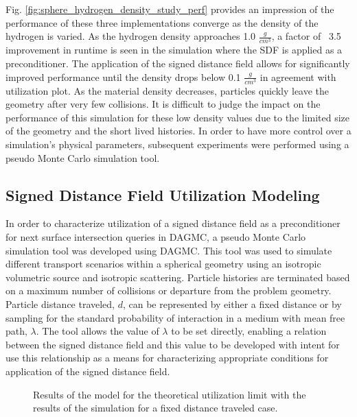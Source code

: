 Fig. \ref{fig:sphere_hydrogen_density_study_perf} provides an impression of the
performance of these three implementations converge as the density of the
hydrogen is varied. As the hydrogen density approaches 1.0 $\frac{g}{cm^3}$, a
factor of ~3.5 improvement in runtime is seen in the simulation where the SDF is
applied as a preconditioner. The application of the signed distance field allows
for significantly improved performance until the density drops below 0.1
$\frac{g}{cm^3}$ in agreement with utilization plot. As the material density
decreases, particles quickly leave the geometry after very few collisions. It is
difficult to judge the impact on the performance of this simulation for these
low density values due to the limited size of the geometry and the short lived
histories.  In order to have more control over a simulation's physical
parameters, subsequent experiments were performed using a pseudo Monte Carlo
simulation tool.

\subsection{Signed Distance Field Utilization Modeling}

In order to characterize utilization of a signed distance field as a
preconditioner for next surface intersection queries in DAGMC, a pseudo Monte
Carlo simulation tool was developed using DAGMC. This tool was used to simulate
different transport scenarios within a spherical geometry using an isotropic
volumetric source and isotropic scattering. Particle histories are terminated
based on a maximum number of collisions or departure from the problem
geometry. Particle distance traveled, $d$, can be represented by either a fixed
distance or by sampling for the standard probability of interaction in a medium
with mean free path, $\lambda$. The tool allows the value of $\lambda$ to be set
directly, enabling a relation between the signed distance field and this value
to be developed with intent for use this relationship as a means for
characterizing appropriate conditions for application of the signed distance
field.

\begin{figure}[H]
  \centering
  {\textwidth}
  \caption{Results of the model for the theoretical utilization limit with the
    results of the simulation for a fixed distance traveled case.}
  \label{fig:sdf_fixed_dist}    
\end{figure}

